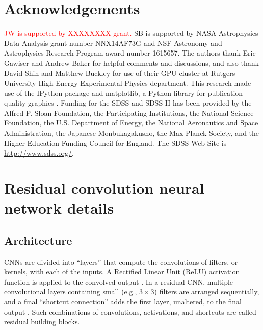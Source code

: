 \documentclass[fleqn,usenatbib]{mnras}
\newcommand{\editorial}[1]{\textcolor{red}{#1}}
\begin{document}
\section*{Acknowledgements}
\editorial{JW is supported by XXXXXXXX grant.}
SB is supported by NASA Astrophysics Data Analysis grant number NNX14AF73G and NSF Astronomy and Astrophysics Research Program award number 1615657.
The authors thank Eric Gawiser and Andrew Baker for helpful comments and discussions, and also thank David Shih and Matthew Buckley for use of their GPU cluster at Rutgers University High Energy Experimental Physics department. %
This research made use of the {\sc IPython} package \citep{Perez2007} and {\sc matplotlib}, a Python library for publication quality graphics \citep{Hunter2007}. Funding for the SDSS and SDSS-II has been provided by the Alfred P. Sloan Foundation, the Participating Institutions, the National Science Foundation, the U.S. Department of Energy, the National Aeronautics and Space Administration, the Japanese Monbukagakusho, the Max Planck Society, and the Higher Education Funding Council for England. The SDSS Web Site is \url{http://www.sdss.org/}.



\appendix
%
\section{Residual convolution neural network details}

\subsection{Architecture}
CNNs are divided into ``layers'' that compute the convolutions of filters, or kernels, with each of the inputs.
A Rectified Linear Unit (ReLU) activation function is applied to the convolved output \citep[ReLUs have been shown to propagate information about the relative importances of different features, and are effective for training deep neural networks;][]{Nair2010}.
In a residual CNN, multiple convolutional layers containing small (e.g., $3\times 3$) filters are arranged sequentially, and a final ``shortcut connection'' adds the first layer, unaltered, to the final output \citep[before the final ReLU activation; see, e.g., Figure~2 of][]{He2015}.
Such combinations of convolutions, activations, and shortcuts are called residual building blocks.
\end{document}
